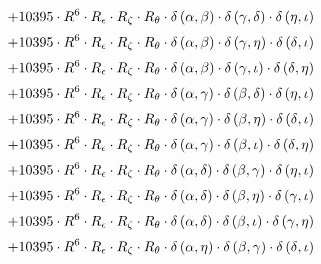 \begin{subequations}
\begin{gather}
 \\[0.2em] \notag 		 + 10395 \cdot R^{6} \cdot R_{\epsilon{}} \cdot R_{\zeta{}} \cdot R_{\theta{}} \cdot \delta{}\left(\alpha{}, \beta{}\right) \cdot \delta{}\left(\gamma{}, \delta{}\right) \cdot \delta{}\left(\eta{}, \iota{}\right) 
 \\[0.2em] \notag 		 + 10395 \cdot R^{6} \cdot R_{\epsilon{}} \cdot R_{\zeta{}} \cdot R_{\theta{}} \cdot \delta{}\left(\alpha{}, \beta{}\right) \cdot \delta{}\left(\gamma{}, \eta{}\right) \cdot \delta{}\left(\delta{}, \iota{}\right) 
 \\[0.2em] \notag 		 + 10395 \cdot R^{6} \cdot R_{\epsilon{}} \cdot R_{\zeta{}} \cdot R_{\theta{}} \cdot \delta{}\left(\alpha{}, \beta{}\right) \cdot \delta{}\left(\gamma{}, \iota{}\right) \cdot \delta{}\left(\delta{}, \eta{}\right) 
 \\[0.2em] \notag 		 + 10395 \cdot R^{6} \cdot R_{\epsilon{}} \cdot R_{\zeta{}} \cdot R_{\theta{}} \cdot \delta{}\left(\alpha{}, \gamma{}\right) \cdot \delta{}\left(\beta{}, \delta{}\right) \cdot \delta{}\left(\eta{}, \iota{}\right) 
 \\[0.2em] \notag 		 + 10395 \cdot R^{6} \cdot R_{\epsilon{}} \cdot R_{\zeta{}} \cdot R_{\theta{}} \cdot \delta{}\left(\alpha{}, \gamma{}\right) \cdot \delta{}\left(\beta{}, \eta{}\right) \cdot \delta{}\left(\delta{}, \iota{}\right) 
 \\[0.2em] \notag 		 + 10395 \cdot R^{6} \cdot R_{\epsilon{}} \cdot R_{\zeta{}} \cdot R_{\theta{}} \cdot \delta{}\left(\alpha{}, \gamma{}\right) \cdot \delta{}\left(\beta{}, \iota{}\right) \cdot \delta{}\left(\delta{}, \eta{}\right) 
 \\[0.2em] \notag 		 + 10395 \cdot R^{6} \cdot R_{\epsilon{}} \cdot R_{\zeta{}} \cdot R_{\theta{}} \cdot \delta{}\left(\alpha{}, \delta{}\right) \cdot \delta{}\left(\beta{}, \gamma{}\right) \cdot \delta{}\left(\eta{}, \iota{}\right) 
 \\[0.2em] \notag 		 + 10395 \cdot R^{6} \cdot R_{\epsilon{}} \cdot R_{\zeta{}} \cdot R_{\theta{}} \cdot \delta{}\left(\alpha{}, \delta{}\right) \cdot \delta{}\left(\beta{}, \eta{}\right) \cdot \delta{}\left(\gamma{}, \iota{}\right) 
 \\[0.2em] \notag 		 + 10395 \cdot R^{6} \cdot R_{\epsilon{}} \cdot R_{\zeta{}} \cdot R_{\theta{}} \cdot \delta{}\left(\alpha{}, \delta{}\right) \cdot \delta{}\left(\beta{}, \iota{}\right) \cdot \delta{}\left(\gamma{}, \eta{}\right) 
 \\[0.2em] \notag 		 + 10395 \cdot R^{6} \cdot R_{\epsilon{}} \cdot R_{\zeta{}} \cdot R_{\theta{}} \cdot \delta{}\left(\alpha{}, \eta{}\right) \cdot \delta{}\left(\beta{}, \gamma{}\right) \cdot \delta{}\left(\delta{}, \iota{}\right) 

\end{gather}
\end{subequations}
